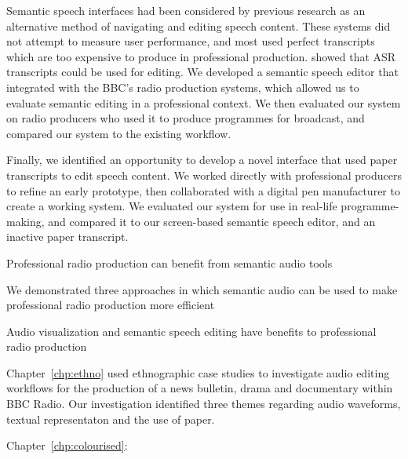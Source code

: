Semantic speech interfaces had been considered by previous research as an alternative method of navigating and
editing speech content.
These systems did not attempt to measure user performance, and most used perfect transcripts which are too expensive to
produce in professional production. \citet{Whittaker2004} showed that ASR transcripts could be used for editing.
We developed a semantic speech editor that integrated with the BBC's radio production systems, which allowed us to
evaluate semantic editing in a professional context.
We then evaluated our system on radio producers who used it to produce programmes for broadcast, and compared our
system to the existing workflow.

Finally, we identified an opportunity to develop a novel interface that used paper transcripts to edit speech content.
We worked directly with professional producers to refine an early prototype, then collaborated with a digital pen
manufacturer to create a working system.
We evaluated our system for use in real-life programme-making, and compared it to our screen-based semantic speech
editor, and an inactive paper transcript.


Professional radio production can benefit from semantic audio tools

We demonstrated three approaches in which semantic audio can be used to make professional radio production more
efficient

Audio visualization and semantic speech editing have benefits to professional radio production





Chapter~\ref{chp:ethno} used ethnographic case studies to investigate audio editing workflows for the production of a
news bulletin, drama and documentary within BBC Radio. Our investigation identified three themes regarding audio
waveforms, textual representaton and the use of paper.

Chapter~\ref{chp:colourised}:


